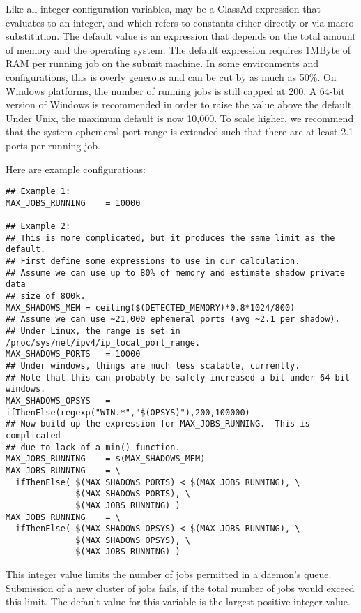 \begin{description}
  Like all integer configuration variables, 
  may be a ClassAd expression that evaluates to an integer, and which
  refers to constants either directly or via macro substitution.
  The default value is an expression that depends on the total amount
  of memory and the operating system.  The default
  expression requires 1MByte of RAM per running job on the submit machine.
  In some environments and configurations, this is overly
  generous and can be cut by as much as 50\%.
  On Windows platforms, the number of running jobs is still capped at 200.
  A 64-bit version of Windows  is recommended in order to raise the value
  above the default.
  Under Unix, the maximum default is now 10,000.  To scale higher, we
  recommend that the system ephemeral port range is extended
  such that there are at least 2.1 ports per running job.

  Here are example configurations:

\footnotesize
\begin{verbatim}
## Example 1:
MAX_JOBS_RUNNING	= 10000

## Example 2:
## This is more complicated, but it produces the same limit as the default.
## First define some expressions to use in our calculation.
## Assume we can use up to 80% of memory and estimate shadow private data
## size of 800k.
MAX_SHADOWS_MEM	= ceiling($(DETECTED_MEMORY)*0.8*1024/800)
## Assume we can use ~21,000 ephemeral ports (avg ~2.1 per shadow).
## Under Linux, the range is set in /proc/sys/net/ipv4/ip_local_port_range.
MAX_SHADOWS_PORTS	= 10000
## Under windows, things are much less scalable, currently.
## Note that this can probably be safely increased a bit under 64-bit windows.
MAX_SHADOWS_OPSYS	= ifThenElse(regexp("WIN.*","$(OPSYS)"),200,100000)
## Now build up the expression for MAX_JOBS_RUNNING.  This is complicated
## due to lack of a min() function.
MAX_JOBS_RUNNING	= $(MAX_SHADOWS_MEM)
MAX_JOBS_RUNNING	= \
  ifThenElse( $(MAX_SHADOWS_PORTS) < $(MAX_JOBS_RUNNING), \
              $(MAX_SHADOWS_PORTS), \
              $(MAX_JOBS_RUNNING) )
MAX_JOBS_RUNNING	= \
  ifThenElse( $(MAX_SHADOWS_OPSYS) < $(MAX_JOBS_RUNNING), \
              $(MAX_SHADOWS_OPSYS), \
              $(MAX_JOBS_RUNNING) )
\end{verbatim}
\normalsize

\label{param:MaxJobsSubmitted}
\item[\Macro{MAX\_JOBS\_SUBMITTED}]
  This integer value limits the number of jobs permitted in 
  a  daemon's queue. Submission of a new cluster
  of jobs fails, if the total number of jobs would exceed this limit. 
  The default value for this variable is the largest positive
  integer value.


\end{description}

